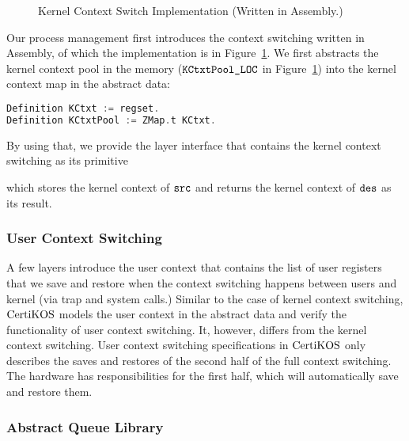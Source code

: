 \begin{figure}
 
\caption{Kernel Context Switch Implementation (Written in Assembly.)}
\label{fig:chapter:certikos:kernel-context-switch-impl}
\end{figure}
Our process management first introduces the context switching written in Assembly, of which the implementation is in Figure~\ref{fig:chapter:certikos:kernel-context-switch-impl}.
We first abstracts the kernel context pool in the memory (${\mathrm{\texttt{KCtxtPool\_LOC}}}$ in Figure~\ref{fig:chapter:certikos:kernel-context-switch-impl}) 
into the kernel context map in the abstract data:
\begin{lstlisting}[language = C, deletekeywords = {Context}]
Definition KCtxt := regset.
Definition KCtxtPool := ZMap.t KCtxt.
\end{lstlisting}
By using that, we provide the layer interface that contains the kernel context switching as its primitive

which stores the kernel context of ${\mathrm{\texttt{src}}}$ and returns the kernel context of ${\mathrm{\texttt{des}}}$ as its result.


\subsubsection{User Context Switching}

A few layers introduce the user context that contains the list of user registers that we save and restore when 
the context switching happens between users and kernel (via trap and system calls.)
Similar to the case of kernel context switching, $\mathrm{CertiKOS}$ models the user context in the abstract data and verify the functionality of user context switching. 
It, however, differs from the kernel context switching.
User context switching specifications in $\mathrm{CertiKOS}$ only describes the saves and restores of the second half of the full context switching.
The hardware has responsibilities for the first half, which will automatically save and restore them.


\subsubsection{Abstract Queue Library}

